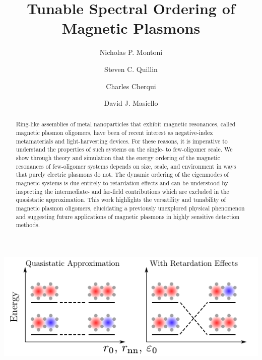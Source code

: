 \documentclass[journal=apchd5,manuscript=article]{achemso}
\author{Nicholas P. Montoni}
\author{Steven C. Quillin}
\author{Charles Cherqui}
\author{David J. Masiello}
\affiliation[Department of Chemistry, University of Washington]
{Department of Chemistry, University of Washington, Seattle, WA 98195}
\title[]
{Tunable Spectral Ordering of Magnetic Plasmons}
\begin{document}
\begin{tocentry}
\includegraphics{toc_graphic_2.pdf}

\end{tocentry}

\begin{abstract}
Ring-like assemblies of metal nanoparticles that exhibit magnetic resonances, called magnetic plasmon oligomers, have been of recent interest as negative-index metamaterials and light-harvesting devices. For these reasons, it is imperative to understand the properties of such systems on the single- to few-oligomer scale. We show through theory and simulation that the energy ordering of the magnetic resonances of few-oligomer systems depends on size, scale, and environment in ways that purely electric plasmons do not. The dynamic ordering of the eigenmodes of magnetic systems is due entirely to retardation effects and can be understood by inspecting the intermediate- and far-field contributions which are excluded in the quasistatic approximation. This work highlights the versatility and tunability of magnetic plasmon oligomers, elucidating a previously unexplored physical phenomenon and suggesting future applications of magnetic plasmons in highly sensitive detection methods. 
\end{abstract}

\end{document}
